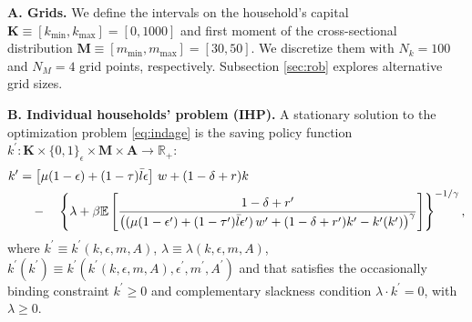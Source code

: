 \documentclass[12pt,american]{article}
\newcommand{\kopt}{k^{\prime}}
\newcommand{\Aset}{\mathbf{A}}
\newcommand{\kset}{\mathbf{K}}
\newcommand{\idset}{\{0,1\}_{\epsilon}}
\newcommand{\kdismomset}{\mathbf{M}}
\newcommand{\lbar}{\bar{l}}
\newcommand{\state}{k,\epsilon,m,A}
\newcommand{\stateset}{\kset \times \idset \times \kdismomset \times \Aset}
\begin{document}
\textbf{A. Grids.} We define the intervals on the household's capital $\kset\equiv[k_{\min},k_{\max}]=[0,1000]$ and first moment of the cross-sectional distribution $\kdismomset\equiv[m_{\min},m_{\max}]=[30,50]$. We discretize them with $N_{k}=100$ and $N_{M}=4$ grid points, respectively. Subsection \ref{sec:rob} explores alternative grid sizes.

\textbf{B. Individual households' problem (IHP).} A stationary solution to the optimization problem \eqref{eq:indage} is the saving policy function $\kopt: \stateset \rightarrow \mathbb{R}_{+}$: 
\begin{align}
\kopt &=\left [\mu(1-\epsilon) + (1-\tau)\lbar \epsilon \right]\,w+ (1-\delta+r)k \notag \\
      &\quad-\quad \left\{\lambda + \beta \mathbb{E}\left[ \frac{1-\delta+r^{\prime}}{\left((\mu(1-\epsilon') + (1-\tau')\lbar \epsilon')\,w'+ (1-\delta+r')\kopt-\kopt(\kopt)\right)^\gamma}\right] \right\}^{-1/\gamma},\label{eq:kopt}
\end{align}
where $\kopt\equiv\kopt(\state)$, $\lambda\equiv \lambda(\state)$, $\kopt(\kopt)\equiv\kopt(\kopt(\state),\epsilon^{\prime},m^{\prime},A^{\prime})$ and that satisfies the occasionally binding constraint $\kopt \geq 0$ and complementary slackness condition $\lambda \cdot \kopt =0$, with $\lambda\geq 0$.
\end{document}
